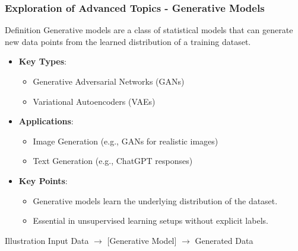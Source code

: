 \documentclass[aspectratio=169]{beamer}
\begin{document}
\begin{frame}[fragile]
    \frametitle{Exploration of Advanced Topics - Generative Models}
    \begin{block}{Definition}
        Generative models are a class of statistical models that can generate new data points from the learned distribution of a training dataset.
    \end{block}
    
    \begin{itemize}
        \item \textbf{Key Types}:
        \begin{itemize}
            \item Generative Adversarial Networks (GANs)
            \item Variational Autoencoders (VAEs)
        \end{itemize}
        
        \item \textbf{Applications}:
        \begin{itemize}
            \item Image Generation (e.g., GANs for realistic images)
            \item Text Generation (e.g., ChatGPT responses)
        \end{itemize}
    
        \item \textbf{Key Points}:
        \begin{itemize}
            \item Generative models learn the underlying distribution of the dataset.
            \item Essential in unsupervised learning setups without explicit labels.
        \end{itemize}
    \end{itemize}
    
    \begin{block}{Illustration}
        Input Data $\rightarrow$ [Generative Model] $\rightarrow$ Generated Data
    \end{block}
\end{frame}
\end{document}
